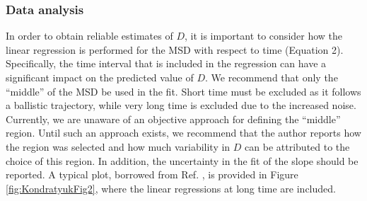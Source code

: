 \documentclass[9pt,bestpractices]{livecoms}
\begin{document}

\subsubsection{Data analysis} \label{sec:Self-Diffusivity:Einstein: Data analysis}

In order to obtain reliable estimates of $D$, it is important to consider how the linear regression is performed for the MSD with respect to time (Equation 2). Specifically, the time interval that is included in the regression can have a significant impact on the predicted value of $D$. We recommend that only the ``middle'' of the MSD be used in the fit. Short time must be excluded as it follows a ballistic trajectory, while very long time is excluded due to the increased noise. Currently, we are unaware of an objective approach for defining the ``middle'' region. Until such an approach exists, we recommend that the author reports how the region was selected and how much variability in $D$ can be attributed to the choice of this region. In addition, the uncertainty in the fit of the slope should be reported. A typical plot, borrowed from Ref. \cite{Kondratyuk2016}, is provided in Figure \ref{fig:KondratyukFig2}, where the linear regressions at long time are included.

\end{document}
